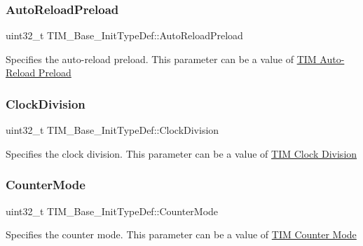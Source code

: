\subsubsection{\texorpdfstring{Auto\+Reload\+Preload}{AutoReloadPreload}}
{\footnotesize\ttfamily uint32\+\_\+t T\+I\+M\+\_\+\+Base\+\_\+\+Init\+Type\+Def\+::\+Auto\+Reload\+Preload}

Specifies the auto-\/reload preload. This parameter can be a value of \hyperlink{group___t_i_m___auto_reload_preload}{T\+IM Auto-\/\+Reload Preload} \mbox{\label{struct_t_i_m___base___init_type_def_ade59c3a547a5409da845592f30596d17}} 
\subsubsection{\texorpdfstring{Clock\+Division}{ClockDivision}}
{\footnotesize\ttfamily uint32\+\_\+t T\+I\+M\+\_\+\+Base\+\_\+\+Init\+Type\+Def\+::\+Clock\+Division}

Specifies the clock division. This parameter can be a value of \hyperlink{group___t_i_m___clock_division}{T\+IM Clock Division} \mbox{\label{struct_t_i_m___base___init_type_def_a16d0c02a8f35426360a64c0706656e35}} 
\subsubsection{\texorpdfstring{Counter\+Mode}{CounterMode}}
{\footnotesize\ttfamily uint32\+\_\+t T\+I\+M\+\_\+\+Base\+\_\+\+Init\+Type\+Def\+::\+Counter\+Mode}

Specifies the counter mode. This parameter can be a value of \hyperlink{group___t_i_m___counter___mode}{T\+IM Counter Mode} \mbox{\label{struct_t_i_m___base___init_type_def_a8fab2bc184bb756763ff59c729b5be55}} 
